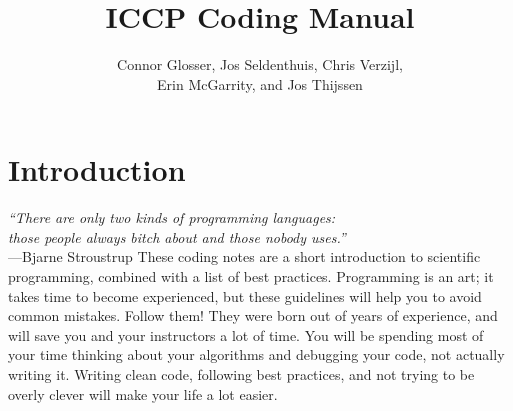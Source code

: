 \documentclass[openany,oneside]{report}
\renewenvironment{quote}{\list{}{\leftmargin=8\parindent}\item\relax}{\endlist}
\begin{document}
\title{ICCP Coding Manual}
\author{Connor Glosser, Jos Seldenthuis, Chris Verzijl, \\ 
  Erin McGarrity, and Jos Thijssen}
\maketitle
\tableofcontents

\chapter{Introduction}
\label{chap:Introduction}

\begin{quote}\small
\emph{``There are only two kinds of programming languages: \\ those people always bitch about and those nobody uses.''} \\ \hspace*{\fill}---Bjarne Stroustrup
\end{quote}
These coding notes are a short introduction to scientific programming, combined with a list of best practices.
Programming is an art; it takes time to become experienced, but these guidelines will help you to avoid common mistakes.
Follow them! They were born out of years of experience, and will save you and your instructors a lot of time.
You will be spending most of your time thinking about your algorithms and debugging your code, not actually writing it.
Writing clean code, following best practices, and not trying to be overly clever will make your life a lot easier.
\end{document}
